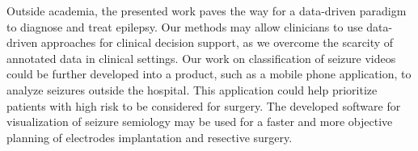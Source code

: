 Outside academia, the presented work paves the way for a data-driven paradigm to diagnose and treat epilepsy.
Our methods may allow clinicians to use data-driven approaches for clinical decision support, as we overcome the scarcity of annotated data in clinical settings.
Our work on classification of seizure videos could be further developed into a product, such as a mobile phone application, to analyze seizures outside the hospital.
This application could help prioritize patients with high risk to be considered for surgery.
The developed software for visualization of seizure semiology may be used for a faster and more objective planning of electrodes implantation and resective surgery.









